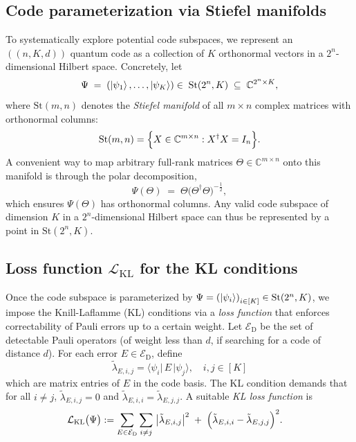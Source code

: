 \documentclass[8pt]{article}
\theoremstyle{definition}
\newcommand{\edset}{\mathcal{E}_\textrm{D}}
\begin{document}
\subsection{Code parameterization via Stiefel manifolds}

To systematically explore potential code subspaces, we represent an \(((n,K,d))\) quantum code as a collection of $K$ orthonormal vectors in a $2^n$-dimensional Hilbert space. Concretely, let
\[ \Psi \;=\; \left(
    \ket{\psi_1}, \ldots, \ket{\psi_K} \right)
    \in\;\mathrm{St}(2^n,K) \;\subseteq\; \mathbb{C}^{2^n\times K},\]
where \(\mathrm{St}(m,n)\) denotes the \emph{Stiefel manifold} of all \(m\times n\) complex matrices with orthonormal columns:
\[ \mathrm{St}(m,n) =\Bigl\{ X\in \mathbb{C}^{m\times n} : X^\dagger X = I_n \Bigr\}. \]
A convenient way to map arbitrary full-rank matrices \(\Theta\in\mathbb{C}^{m\times n}\) onto this manifold is through the polar decomposition,
\[\Psi(\Theta) \;=\; \Theta\bigl(\Theta^\dagger \Theta\bigr)^{-\tfrac{1}{2}},\]
which ensures \(\Psi(\Theta)\) has orthonormal columns. Any valid code subspace of dimension $K$ in a $2^n$-dimensional Hilbert space can thus be represented by a point in \(\mathrm{St}(2^n,K)\).

\subsection{Loss function \(\mathcal{L}_{\mathrm{KL}}\) for the KL conditions}

Once the code subspace is parameterized by \(\Psi = \left(\ket{\psi_i}\right)_{i \in [K]} \in \mathrm{St}(2^n,K)\), we impose the Knill-Laflamme (KL) conditions via a \emph{loss function} that enforces correctability of Pauli errors up to a certain weight. Let \( \edset \) be the set of detectable Pauli operators (of weight less than \(d\), if searching for a code of distance \(d\)). For each error $E \in \edset$, define
\[
    \tilde{\lambda}_{E, i,j}
    =\langle\psi_i|\,E\,|\psi_j\rangle,\quad i,j \in [K]
\]
which are matrix entries of \(E\) in the code basis. The KL condition demands that for all \(i\neq j\),
\(\tilde{\lambda}_{E,i,j} = 0\) and
\(\tilde{\lambda}_{E,i,i} = \tilde{\lambda}_{E,j,j}\).  A suitable \emph{KL loss function} is
\begin{align}
    \mathcal{L}_{\mathrm{KL}}\bigl(\Psi\bigr)
     &:=
    \sum_{E \in \edset}\sum_{i\neq j}
    \;\bigl|\tilde{\lambda}_{E,i,j}\bigr|^2
    \;+\;
    \Bigl(\tilde{\lambda}_{E,i,i}
    - \tilde{\lambda}_{E,j,j} \Bigr)^{2}.
\end{align}
\end{document}
